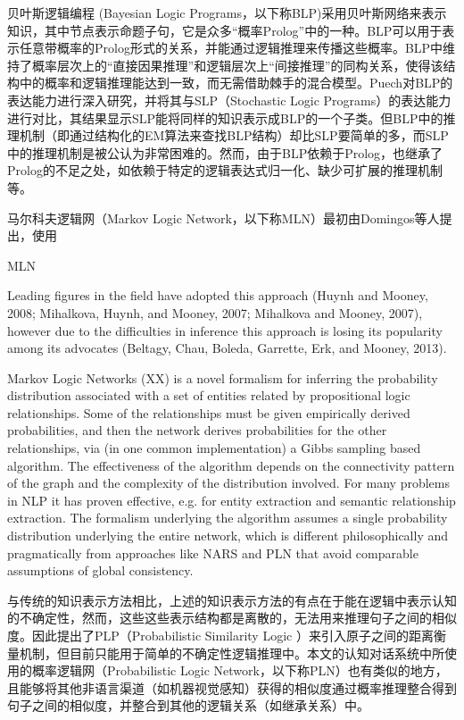       贝叶斯逻辑编程 (Bayesian Logic Programs，以下称BLP)\cite{Kersting2007}采用贝叶斯网络来表示知识，其中节点表示命题子句，它是众多“概率Prolog”中的一种。BLP可以用于表示任意带概率的Prolog形式的关系，并能通过逻辑推理来传播这些概率。BLP中维持了概率层次上的“直接因果推理”和逻辑层次上“间接推理”的同构关系，使得该结构中的概率和逻辑推理能达到一致，而无需借助棘手的混合模型。Puech\cite{Puech2003}对BLP的表达能力进行深入研究，并将其与SLP（Stochastic Logic Programs）的表达能力进行对比，其结果显示SLP能将同样的知识表示成BLP的一个子类。但BLP中的推理机制（即通过结构化的EM算法来查找BLP结构）却比SLP要简单的多，而SLP中的推理机制是被公认为非常困难的\cite{DaRaett2003}。然而，由于BLP依赖于Prolog，也继承了Prolog的不足之处，如依赖于特定的逻辑表达式归一化、缺少可扩展的推理机制等。
     
   马尔科夫逻辑网（Markov Logic Network，以下称MLN）最初由Domingos等人提出\cite{Domingos2007}，使用


MLN


 Leading figures in the field have adopted this approach
(Huynh and Mooney, 2008; Mihalkova, Huynh, and Mooney, 2007; Mihalkova and Mooney,
2007), however due to the difficulties in inference this approach is losing its popularity
among its advocates (Beltagy, Chau, Boleda, Garrette, Erk, and Mooney,
2013).

Markov Logic Networks (XX) is a novel formalism for inferring the
probability distribution associated with a set of entities related by
propositional logic relationships.   Some of the relationships must be
given empirically derived probabilities, and then the network derives
probabilities for the other relationships, via (in one common
implementation) a Gibbs sampling based algorithm.   The effectiveness
of the algorithm depends on the connectivity pattern of the graph and
the complexity of the distribution involved.  For many problems in NLP
it has proven effective, e.g. for entity extraction and semantic
relationship extraction.   The formalism underlying the algorithm
assumes a single probability distribution underlying the entire
network, which is different philosophically and pragmatically from
approaches like NARS and PLN that avoid comparable assumptions of
global consistency.


     与传统的知识表示方法相比，上述的知识表示方法的有点在于能在逻辑中表示认知的不确定性，然而，这些这些表示结构都是离散的，无法用来推理句子之间的相似度。因此\cite{Brocheler2012}提出了PLP（Probabilistic Similarity Logic ）来引入原子之间的距离衡量机制，但目前只能用于简单的不确定性逻辑推理中。本文的认知对话系统中所使用的概率逻辑网（Probabilistic Logic Network，以下称PLN）也有类似的地方，且能够将其他非语言渠道（如机器视觉感知）获得的相似度通过概率推理整合得到句子之间的相似度，并整合到其他的逻辑关系（如继承关系）中。

